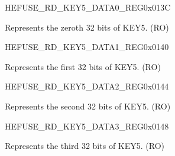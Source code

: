\begin{register}{H}{EFUSE\_RD\_KEY5\_DATA0\_REG}{0x013C}\label{regdesc:EFUSERDKEY5DATA0REG}
%
\regnewline%
\begin{regdesc}\begin{reglist}
\label{fielddesc:EFUSEKEY5DATA0}\item [EFUSE\_KEY5\_DATA0] Represents the zeroth 32 bits of KEY5. (RO)
\end{reglist}\end{regdesc}
\end{register}


\begin{register}{H}{EFUSE\_RD\_KEY5\_DATA1\_REG}{0x0140}\label{regdesc:EFUSERDKEY5DATA1REG}
%
\regnewline%
\begin{regdesc}\begin{reglist}
\label{fielddesc:EFUSEKEY5DATA1}\item [EFUSE\_KEY5\_DATA1] Represents the first 32 bits of KEY5. (RO)
\end{reglist}\end{regdesc}
\end{register}


\begin{register}{H}{EFUSE\_RD\_KEY5\_DATA2\_REG}{0x0144}\label{regdesc:EFUSERDKEY5DATA2REG}
%
\regnewline%
\begin{regdesc}\begin{reglist}
\label{fielddesc:EFUSEKEY5DATA2}\item [EFUSE\_KEY5\_DATA2] Represents the second 32 bits of KEY5. (RO)
\end{reglist}\end{regdesc}
\end{register}


\begin{register}{H}{EFUSE\_RD\_KEY5\_DATA3\_REG}{0x0148}\label{regdesc:EFUSERDKEY5DATA3REG}
%
\regnewline%
\begin{regdesc}\begin{reglist}
\label{fielddesc:EFUSEKEY5DATA3}\item [EFUSE\_KEY5\_DATA3] Represents the third 32 bits of KEY5. (RO)
\end{reglist}\end{regdesc}
\end{register}


